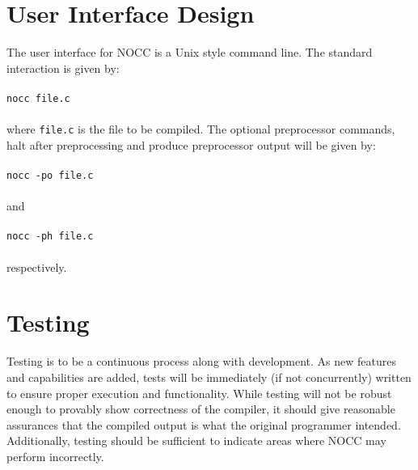 \documentclass{article}
\begin{document}
\section{User Interface Design}
The user interface for NOCC is a Unix style command line.  The standard interaction is given by:\\ \\
\texttt{nocc file.c}\\ \\
where \texttt{file.c} is the file to be compiled.
The optional preprocessor commands, halt after preprocessing and produce preprocessor output will be given by:\\ \\
\texttt{nocc -po file.c}\\ \\
and\\ \\
\texttt{nocc -ph file.c}\\ \\
respectively.

\section{Testing}
Testing is to be a continuous process along with development.
As new features and capabilities are added, tests will be immediately (if not concurrently) written to ensure proper execution and functionality.
While testing will not be robust enough to provably show correctness of the compiler, it should give reasonable assurances that the compiled output is what the original programmer intended.
Additionally, testing should be sufficient to indicate areas where NOCC may perform incorrectly.
\end{document}
